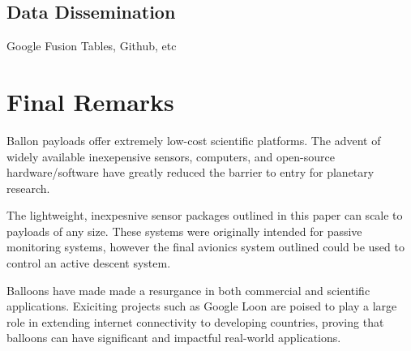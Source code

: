 \documentclass[heading.tex]{subfiles}
\begin{document}
\subsection{Data Dissemination}

Google Fusion Tables, Github, etc

\section{Final Remarks}

Ballon payloads offer extremely low-cost scientific platforms.
The advent of widely available inexepensive sensors, computers, and open-source
hardware/software have greatly reduced the barrier to entry for planetary
research.

The lightweight, inexpesnive sensor packages outlined in this paper can
scale to payloads of any size.
These systems were originally intended for passive monitoring systems,
however the final avionics system outlined could be used to control an
active descent system.

Balloons have made made a resurgance in both commercial and scientific applications.
Exiciting projects such as Google Loon are poised to play a large role in
extending internet connectivity to developing countries, proving that balloons
can have significant and impactful real-world applications. \cite{Loon}
\end{document}
